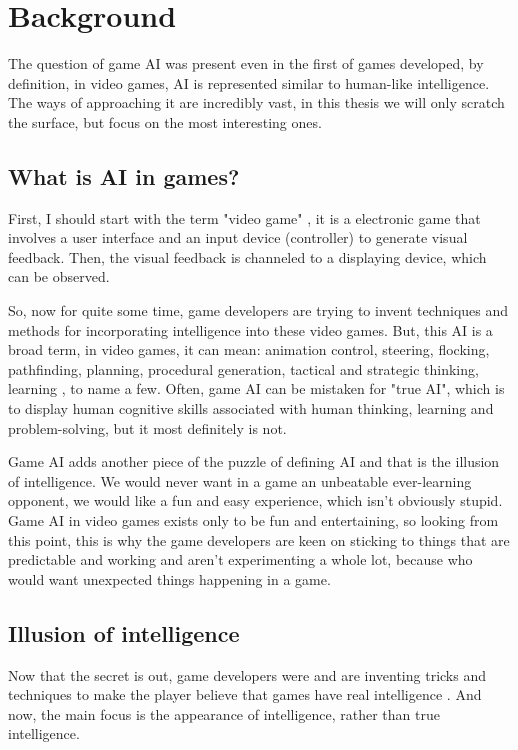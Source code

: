 \documentclass[a4paper, 12pt]{book}
\begin{document}
\chapter{Background}
\label{ch1}
The question of game AI \cite{AIwiki} was present even in the first of games developed, by definition, in video games, AI is represented similar to human-like intelligence. The ways of approaching it are incredibly vast, in this thesis we will only scratch the surface, but focus on the most interesting ones.

\section{What is AI in games?}
First, I should start with the term "video game" \cite{VideoGameWiki}, it is a electronic game that involves a user interface and an input device (controller) to generate visual feedback. Then, the visual feedback is channeled to a displaying device, which can be observed. 

So, now for quite some time, game developers are trying to invent techniques and methods for incorporating intelligence into these video games. But, this AI is a broad term, in video games, it can mean: animation control, steering, flocking, pathfinding, planning, procedural generation, tactical and strategic thinking, learning \cite{FuzzyAIGames}, to name a few. Often, game AI can be mistaken for "true AI", which is to display human cognitive skills associated with human thinking, learning and problem-solving, but it most definitely is not.

Game AI adds another piece of the puzzle of defining AI and that is the illusion of intelligence. We would never want in a game an unbeatable ever-learning opponent, we would like a fun and easy experience, which isn't obviously stupid. Game AI in video games exists only to be fun and entertaining, so looking from this point, this is why the game developers are keen on sticking to things that are predictable and working and aren't experimenting a whole lot, because who would want unexpected things happening in a game.

\section{Illusion of intelligence}
Now that the secret is out, game developers were and are inventing tricks and techniques to make the player believe that games have real intelligence \cite{IllusionOfIntelligece}. And now, the main focus is the appearance of intelligence, rather than true intelligence.
\end{document}
